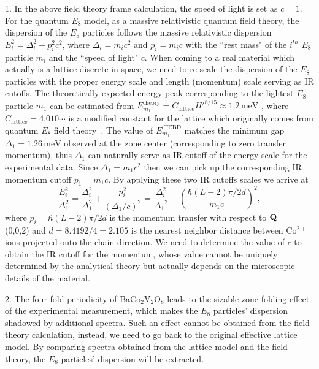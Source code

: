 \documentclass[aps,prl,twocolumn,superscriptaddress,groupedaddress]{revtex4}
\begin{document}
1. In the above field theory frame calculation, the speed of light is set as $c=1$. For the quantum $E_8$ model, as a massive relativistic quantum field theory, the dispersion of the $E_8$ particles follows the massive relativistic dispersion $E_i^2 = \Delta _i^2 + p_i^2{c^2}$, where $\Delta_i = m_i c^2$ and $p_i = m_i c$ with the ``rest mass" of the $i^{th}$ $E_8$ particle $m_i$ and the ``speed of light" $c$. When coming to a real material which actually is a lattice discrete in space, we need to re-scale the dispersion of the $E_8$ particles with the proper energy scale and length (momentum) scale serving as IR cutoffs. The theoretically expected energy peak corresponding to the lightest $E_{8}$ particle $m_{1}$ can be estimated from $E_{m_{1}}^{\text{theory}}=C_{\text{lattice}}H'^{8/15} \approx 1.2 \, \text{meV}$
\cite{Yang_2023}, where $C_{\text{lattice}} = 4.010\cdots$ is a modified constant for the lattice which originally comes from quantum $E_{8}$ field theory~\cite{E8_lattice}.
The value of $E_{m_{1}}^{\text{iTEBD}}$ matches the minimum gap
$\Delta_1 = 1.26 \,\text{meV}$ observed at the zone center (corresponding to zero transfer momentum), thus $\Delta_1$ can naturally serve as IR cutoff of the energy scale for the experimental data.
Since $\Delta_1 = m_1 c^2$ then we can pick up the corresponding IR momentum cutoff $p_1 = m_1 c$. By applying these two IR cutoffs scales we arrive at
\begin{equation}
\frac{{E_i^2}}{{{\Delta_{1}^{2}}}} = \frac{{\Delta _i^2}}{{\Delta_{1}^{2}}} + \frac{{p_i^2}}{(\Delta_{1}/c)^{2}}= \frac{{\Delta_i^2}}{{{{\Delta_1}^2}}} + \left( {\frac{{\hbar (L - 2)\pi /2d}}{{{m_1}c}}} \right)^2,
\label{eq:fit}
\end{equation}
where $p_i=\hbar(L - 2)\pi /2d$ is the momentum transfer with respect to ${\bf Q}$ = (0,0,2) and $d=8.4192/4=2.105$ is the nearest neighbor distance between Co$^{2+}$ ions projected onto the chain direction.
We need to determine the value of $c$ to obtain the IR cutoff for the momentum, whose value cannot be uniquely determined by the analytical theory but actually depends on the microscopic details of the material.

2. The four-fold periodicity of BaCo$_2$V$_2$O$_8$ leads to the sizable zone-folding effect of the experimental measurement, which makes the $E_{8}$ particles' dispersion shadowed by additional spectra. Such an effect cannot be obtained from the field theory calculation, instead, we need to go back to the original effective lattice model. By comparing spectra obtained from the lattice model and the field theory, the $E_{8}$ particles' dispersion will be extracted.
\end{document}
